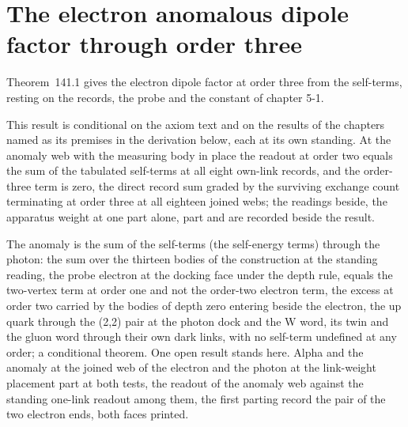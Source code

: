 \section{The electron anomalous dipole factor through order three}\label{mod:V-2-electron-anomalous-dipole-factor-through-order-three}
\label{narr:open:5-2}Theorem~141.1 gives the electron dipole factor at order three from the self-terms, resting on the records, the probe and the constant of chapter 5-1.
\begin{chconditional}\label{box:V-2-electron-anomalous-dipole-factor-through-order-three:1}
This result is conditional on the axiom text and on the results of the chapters named as its premises in the derivation below, each at its own standing.
At the anomaly web with the measuring body in place the readout at order two equals the sum of the tabulated self-terms at all eight own-link records, and the order-three term is zero, the direct record sum graded by the surviving exchange count terminating at order three at all eighteen joined webs; the readings beside, the apparatus weight at one part alone, part and are recorded beside the result.
\end{chconditional}
The anomaly is the sum of the self-terms (the self-energy terms) through the photon: the sum over the thirteen bodies of the construction at the standing reading, the probe electron at the docking face under the depth rule, equals the two-vertex term at order one and not the order-two electron term, the excess at order two carried by the bodies of depth zero entering beside the electron, the up quark through the (2,2) pair at the photon dock and the W word, its twin and the gluon word through their own dark links, with no self-term undefined at any order; a conditional theorem.
One open result stands here. Alpha and the anomaly at the joined web of the electron and the photon at the link-weight placement part at both tests, the readout of the anomaly web against the standing one-link readout among them, the first parting record the pair of the two electron ends, both faces printed.
